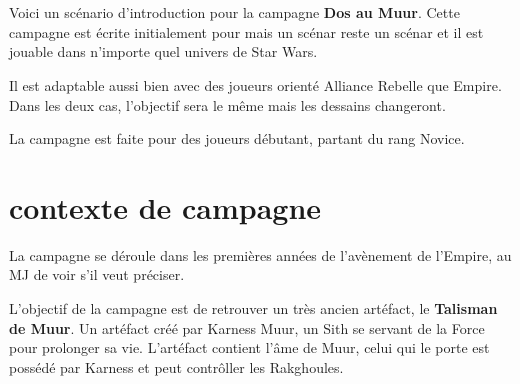 \documentclass{jdrp}
\begin{document}
\begin{titlepage}

\begin{center}
	\hspace*{\vfill}
	\noindent\Huge{}\\ 
	\noindent\fontsize{50}{70}\jedifont{\$}
	\noindent\fontsize{50}{70}\jedifont{\#}\\
	\noindent\fontsize{50}{60}
	\hspace*{\vfill}
	\Large{}
\end{center}

\hspace*{\vfill}

\noindent{}

\end{titlepage}

Voici un scénario d'introduction pour la campagne \textbf{Dos au Muur}. Cette campagne est écrite initialement pour  mais un scénar reste un scénar et il est jouable dans n'importe quel univers de Star Wars.

Il est adaptable aussi bien avec des joueurs orienté Alliance Rebelle que Empire. Dans les deux cas, l'objectif sera le même mais les dessains changeront.

La campagne est faite pour des joueurs débutant, partant du rang Novice.

\section{contexte de campagne}
La campagne se déroule dans les premières années de l'avènement de l'Empire, au MJ de voir s'il veut préciser.

L'objectif de la campagne est de retrouver un très ancien artéfact, le \textbf{Talisman de Muur}. Un artéfact créé par Karness Muur, un Sith se servant de la Force pour prolonger sa vie. L'artéfact contient l'âme de Muur, celui qui le porte est possédé par Karness et peut contrôller les Rakghoules.
\end{document}
